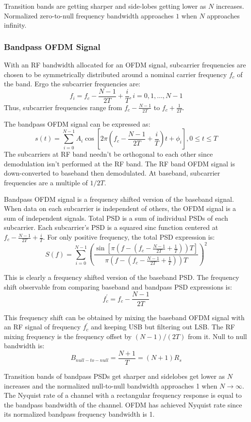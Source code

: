 Transition bands are getting sharper and side-lobes getting lower as $N$ increases. Normalized zero-to-null frequency bandwidth approaches $1$ when $N$ approaches infinity.

\subsubsection{Bandpass \gls{OFDM} Signal}
With an \gls{RF} bandwidth allocated for an \gls{OFDM} signal, \gls{subcarrier} frequencies are chosen to be symmetrically distributed around a nominal carrier frequency $f_c$ of the band. Ergo the \gls{subcarrier} frequencies are:
$$f_i = f_c - \frac{N-1}{2T}+\frac{i}{T}, i=0,1,\ldots,N-1$$
Thus, \gls{subcarrier} frequencies range from $f_c - \frac{N-1}{2T}$ to $f_c + \frac{1}{2T}$.

The bandpass \gls{OFDM} signal can be expressed as\cite{fuqin}:
$$s(t) = \sum_{i=0}^{N-1}A_i\cos\left[ 2\pi\left( f_c-\frac{N-1}{2T}+\frac{i}{T}\right)t + \phi_i\right], 0\leq t\leq T$$
The \gls{subcarrier}s at \gls{RF} band needn't be \gls{orthogonal} to each other since demodulation isn't performed at the \gls{RF} band\cite{fuqin}. The RF band OFDM signal is down-converted to baseband then demodulated. At baseband, subcarrier frequencies are a multiple of $1/2T$\cite{fuqin}.

Bandpass OFDM signal is a frequency shifted version of the baseband signal. When data on each subcarrier is independent of others, the OFDM signal is a sum of independent signals. Total PSD is a sum of individual PSDs of each subcarrier. Each subcarrier's PSD is a squared sinc function centered at $f_c - \frac{N-1}{2T}+\frac{i}{T}$. For only positive frequency, the total PSD expression is:
$$S(f) = \sum_{i=0}^{N-1}\left( \frac{\sin\left[ \pi(f-(f_c-\frac{N-1}{2T}+\frac{1}{T}))T\right]}{\pi(f-(f_c-\frac{N-1}{2T}+\frac{1}{T}))T}\right)^2$$

This is clearly a frequency shifted version of the baseband \gls{PSD}. The frequency shift observable from comparing baseband and bandpass \gls{PSD} expressions is:
$$f_c^\prime = f_c - \frac{N-1}{2T}$$

This frequency shift can be obtained by mixing the baseband OFDM signal with an RF signal of frequency $f_c^\prime$ and keeping \gls{USB} but filtering out \gls{LSB}. The RF mixing frequency is the frequency offset by $(N-1)/(2T)$ from it.
Null to null bandwidth is:
$$B_{null-to-null}=\frac{N+1}{T}=(N+1)R_s$$

Transition bands of bandpass PSDs get sharper and sidelobes get lower as $N$ increases and the normalized null-to-null bandwidth approaches 1 when $N\to\infty$\cite{fuqin}.
The Nyquist rate of a channel with a rectangular frequency response is equal to the bandpass bandwidth of the channel. OFDM has achieved Nyquist rate since its normalized bandpass frequency bandwidth is 1\cite{fuqin}. 

